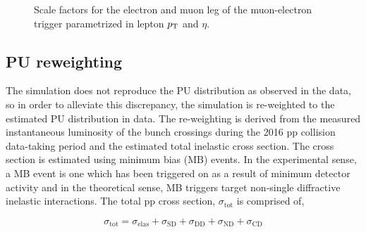 \begin{figure}
\begin{center} 
    \caption{Scale factors for the electron and muon leg of the muon-electron trigger parametrized in lepton $p_{\mathrm{T}}$ and $\eta$.}
    \label{fig:mueg_sf}
  \end{center}
\end{figure}

\subsection{PU reweighting}
\label{subsec:pu}
The simulation does not reproduce the PU distribution as observed in the data, so in order to alleviate this discrepancy, the simulation is re-weighted to the estimated PU distribution in data. The re-weighting is derived from the measured instantaneous luminosity of the bunch crossings during the 2016 pp collision data-taking period and the estimated total inelastic cross section. The cross section is estimated using minimum bias (MB) events. In the experimental sense, a MB event is one which has been triggered on as a result of minimum detector activity and in the theoretical sense, MB triggers target non-single diffractive inelastic interactions. The total pp cross section, $\sigma_\mathrm{tot}$ is comprised of,

\begin{equation}
  \sigma_{\mathrm{tot}} = \sigma_{\mathrm{elas}} + \sigma_{\mathrm{SD}} + \sigma_{\mathrm{DD}} + \sigma_{\mathrm{ND}} + \sigma_{\mathrm{CD}}
  \label{eq:totppxsec}
\end{equation}

